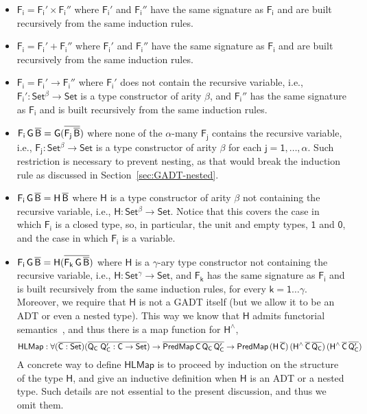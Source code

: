 \documentclass[9pt]{entcs}
\begin{document}
\begin{itemize}
\item $\mathsf{F_i = F_i' \times F_i''}$ where $\mathsf{F_i'}$ and $\mathsf{F_i''}$ have the same signature as $\mathsf{F_i}$ and are built recursively from the same induction rules.
\item $\mathsf{F_i = F_i' + F_i''}$ where $\mathsf{F_i'}$ and $\mathsf{F_i''}$ have the same signature as $\mathsf{F_i}$ and are built recursively from the same induction rules.
\item $\mathsf{F_i = F_i' \to F_i''}$
where $\mathsf{F_i'}$ does not contain the recursive variable,
i.e., $\mathsf{F_i' : Set^\beta \to Set}$ is a type constructor of arity $\mathsf{\beta}$,
and $\mathsf{F_i''}$ has the same signature as $\mathsf{F_i}$ and is built recursively from the same induction rules.
\item $\mathsf{F_i\,G\,\overline{B} = G(\overline{F_j\,\overline{B}})}$
where none of the $\mathsf{\alpha}$-many $\mathsf{F_j}$ contains the recursive variable,
i.e., $\mathsf{F_j : Set^\beta \to Set}$
is a type constructor of arity $\mathsf{\beta}$
for each $\mathsf{j = 1, \dots, \alpha}$.
Such restriction is necessary to prevent nesting,
as that would break the induction rule as discussed in Section~\ref{sec:GADT-nested}.
\item $\mathsf{F_i\,G\,\overline{B} = H\,\overline{B}}$
where $\mathsf{H}$ is a type constructor of arity $\mathsf{\beta}$ not containing the recursive variable,
i.e., $\mathsf{H : Set^\beta \to Set}$.
Notice that this covers the case in which $\mathsf{F_i}$ is a closed type,
so, in particular, the unit and empty types, $\mathsf{1}$ and $\mathsf{0}$,
and the case in which $\mathsf{F_i}$ is a variable.
\item $\mathsf{F_i\,G\,\overline{B} = H (\overline{F_k\,G\,\overline{B}})}$
where $\mathsf{H}$ is a $\mathsf{\gamma}$-ary type constructor not containing the recursive variable,
i.e., $\mathsf{H : Set^\gamma \to Set}$,
and $\mathsf{F_k}$ has the same signature as $\mathsf{F_i}$  and is built recursively from the same induction rules, for every $\mathsf{k = 1 \dots \gamma}$.
Moreover, we require that $\mathsf{H}$ is not a GADT itself (but we allow it to be an ADT or even a nested type).
This way we know that $\mathsf{H}$ admits functorial semantics~\cite{jp20}, and thus there is a map function for $\mathsf{H^{\wedge}}$,
\[
\mathsf{HLMap : \forall (\overline{C : Set}) (\overline{Q_C\;Q_C' : C \to Set})
	\to \overline{PredMap\,C\,Q_C\,Q_C'}
	\to PredMap\,(H\,\overline{C})\,(H^{\wedge}\,\overline{C}\,\overline{Q_C})\,(H^{\wedge}\,\overline{C}\,\overline{Q_C'})}
\]
A concrete way to define $\mathsf{HLMap}$ is to proceed by induction on the structure of the type $\mathsf{H}$,
and give an inductive definition when $\mathsf{H}$ is an ADT or a nested type.
Such details are not essential to the present discussion, and thus we omit them.
\end{itemize}
\end{document}
